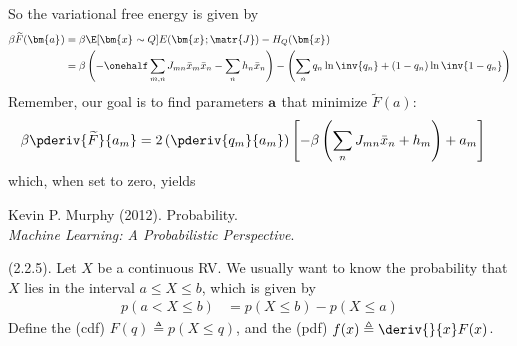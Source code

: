 \documentclass[11pt]{article}
\renewcommand\vec[2][]{\bm{#2}_{#1}}
\newcommand\p{\Needspace{10\baselineskip} \noindent}
\begin{document}
So the variational free energy is given by
\begin{align}
	\beta \widetilde{F}(\vec a)
	&= \beta \E[\vec x \sim Q]{E(\vec x; \matr{J})} - H_Q(\vec x) \\
	&= \beta \left(  -\onehalf \sum_{m,n} J_{mn} \bar x_m \bar x_n - \sum_n h_n \bar x_n \right) - 
	\left( \sum_n q_n \ln \inv{q_n} +  (1 - q_n) \ln \inv{ 1 - q_n } \right)
\end{align}
Remember, our goal is to find parameters $\vec a$ that minimize $\widetilde F(a)$:
\begin{align}
	\beta \pderiv{\widetilde F}{a_m}
	&= 2 \left( \pderiv{q_m}{a_m} \right) \left[ 
		- \beta \left( 
			\sum_n J_{mn} \bar x_n + h_m
		\right) + a_m
	\right]
\end{align}
which, when set to zero, yields



\label{Machine Learning: A Probabilistic Perspective}


\vspace{-1.7em}
{\scriptsize Kevin P. Murphy (2012). Probability.\\ \textit{Machine Learning: A Probabilistic Perspective}.\\ }

\p {} (2.2.5). Let $X$ be a continuous RV. We usually want to know the probability that $X$ lies in the interval $a \le X \le b$, which is given by
\begin{align}
	p(a < X \le b)
		&= p(X \le b) - p(X \le a)
\end{align}
Define the  (cdf) $F(q) \triangleq p(X \le q)$, and the  (pdf) $f(x) \triangleq \deriv{}{x} F(x)$. 
\end{document}
